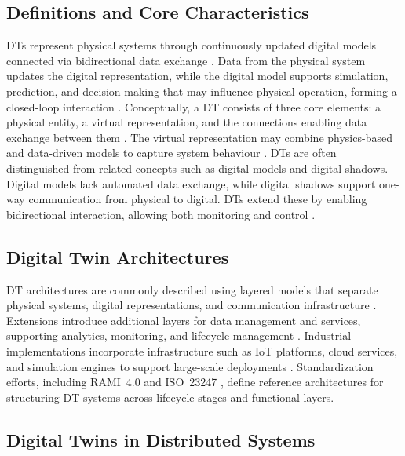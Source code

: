 \subsection{Definitions and Core Characteristics}

DTs represent physical systems through continuously updated digital models connected via bidirectional data exchange \cite{david2024infonomics}. Data from the physical system updates the digital representation, while the digital model supports simulation, prediction, and decision-making that may influence physical operation, forming a closed-loop interaction \cite{tao2018digital}. Conceptually, a DT consists of three core elements: a physical entity, a virtual representation, and the connections enabling data exchange between them \cite{vanderhorn2021digital}. The virtual representation may combine physics-based and data-driven models to capture system behaviour \cite{negri2017review}. DTs are often distinguished from related concepts such as digital models and digital shadows. Digital models lack automated data exchange, while digital shadows support one-way communication from physical to digital. DTs extend these by enabling bidirectional interaction, allowing both monitoring and control \cite{kritzinger2018digital}.

\subsection{Digital Twin Architectures}
DT architectures are commonly described using layered models that separate physical systems, digital representations, and communication infrastructure \cite{tao2018digital}. Extensions introduce additional layers for data management and services, supporting analytics, monitoring, and lifecycle management \cite{tao2019digital}. Industrial implementations incorporate infrastructure such as IoT platforms, cloud services, and simulation engines to support large-scale deployments \cite{redelinghuys2020six}. Standardization efforts, including RAMI~4.0 \cite{DIN91345} and ISO~23247 \cite{ISO23247-1}, define reference architectures for structuring DT systems across lifecycle stages and functional layers.

\subsection{Digital Twins in Distributed Systems}

